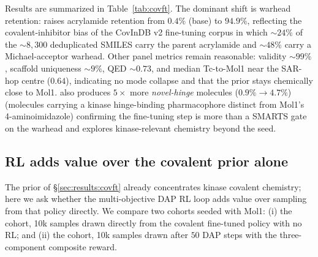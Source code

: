 Results are summarized in Table~\ref{tab:covft}. The dominant shift is warhead retention: \Cvcovaft{} raises acrylamide retention from $0.4\%$ (base) to $94.9\%$, reflecting the covalent-inhibitor bias of the CovInDB v2 fine-tuning corpus in which $\sim 24\%$ of the $\sim 8{,}300$ deduplicated SMILES carry the parent acrylamide and $\sim 48\%$ carry a Michael-acceptor warhead. Other panel metrics remain reasonable: validity $\sim 99\%$, scaffold uniqueness $\sim 9\%$, QED $\sim 0.73$, and median Tc-to-Mol1 near the SAR-hop centre ($0.64$), indicating no mode collapse and that the \Cvcovaft{} prior stays chemically close to Mol1. \Cvcovaft{} also produces $5\times$ more \emph{novel-hinge} molecules ($0.9\% \to 4.7\%$) (molecules carrying a kinase hinge-binding pharmacophore distinct from Mol1's 4-aminoimidazole) confirming the fine-tuning step is more than a SMARTS gate on the warhead and explores kinase-relevant chemistry beyond the seed.

\subsection{RL adds value over the covalent prior alone}
\label{sec:results:rl_value}

The \Cvcovaft{} prior of \S\ref{sec:results:covft} already concentrates kinase covalent chemistry; here we ask whether the multi-objective DAP RL loop adds value over sampling from that policy directly. We compare two cohorts seeded with Mol1: (i) the \textbf{\Cvcovaft{}} cohort, 10k samples drawn directly from the covalent fine-tuned policy with no RL; and (ii) the \textbf{\Cvdap{}} cohort, 10k samples drawn after $50$ DAP steps with the three-component composite reward.

